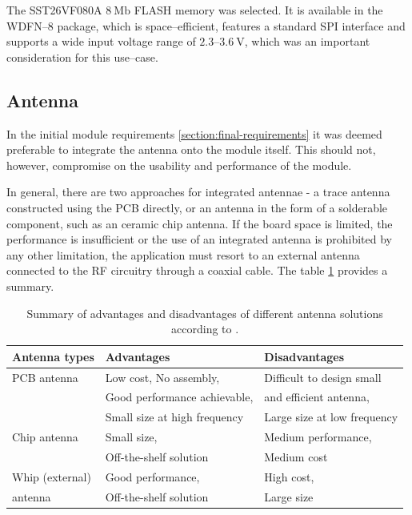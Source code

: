 The SST26VF080A $8~\mathrm{Mb}$ FLASH memory was selected. It is available in the WDFN--8 package, which is space--efficient, features a standard SPI interface and supports a wide input voltage range of $2.3\text{--}3.6~\mathrm{V}$, which was an important consideration for this use--case.

\subsection{\label{section:antenna}Antenna}
In the initial module requirements \ref{section:final-requirements} it was deemed preferable to integrate the antenna onto the module itself. This should not, however, compromise on the usability and performance of the module. 

In general, there are two approaches for integrated antennae - a trace antenna constructed using the PCB directly, or an antenna in the form of a solderable component, such as an ceramic chip antenna. If the board space is limited, the performance is insufficient or the use of an integrated antenna is prohibited by any other limitation, the application must resort to an external antenna connected to the RF circuitry through a coaxial cable. The table \ref{table:antenna-solutions} provides a summary.

\begin{table}[H]
\begin{center}
\caption{\label{table:antenna-solutions}Summary of advantages and disadvantages of different antenna solutions according to \cite{andersen_selecting_2008}.}
    \begin{tabular}{|l|l|l|}
    \hline
    \textbf{Antenna types} & \textbf{Advantages} & \textbf{Disadvantages} \\
    \hline
    PCB antenna  & Low cost, No assembly,        & Difficult to design small \\
                 & Good performance achievable,  & and efficient antenna, \\
                 & Small size at high frequency  & Large size at low frequency \\
    \hline
    Chip antenna & Small size,                   & Medium performance, \\
                 & Off-the-shelf solution        & Medium cost \\
    \hline
    Whip (external)& Good performance,           & High cost, \\
    antenna        & Off-the-shelf solution      & Large size \\
    \hline
    \end{tabular}
\end{center}
\end{table}

